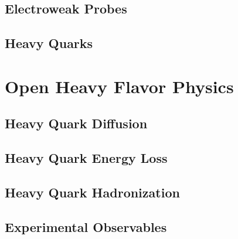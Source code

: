 \subsection{Electroweak Probes}

\subsection{Heavy Quarks}

\section{Open Heavy Flavor Physics}

\subsection{Heavy Quark Diffusion}

\subsection{Heavy Quark Energy Loss}

\subsection{Heavy Quark Hadronization}

\subsection{Experimental Observables}




